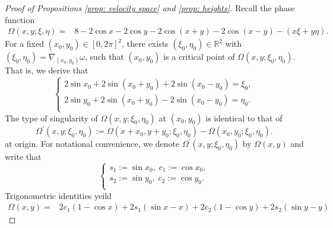 \documentclass[12pt]{amsart}
\newcommand{\R}{\mathbb{R}}
\begin{document}
	\begin{proof}[Proof of Propositions \ref{prop: velocity space} and \ref{prop: heights}]
		
		Recall the phase function \begin{equation}
			\begin{aligned}
				\Omega\left(x,y;\xi,\eta\right)=&8-2\cos x-2\cos y-2\cos\left(x+y\right)-2\cos\left(x-y\right)-\left(x\xi+y\eta\right).
			\end{aligned}  
		\end{equation}
For a fixed $\left(x_{0},y_{0}\right)\in\left[0,2\pi\right]^{2}$, there exists  $\left(\xi_{0},\eta_{0}\right)\in\R^{2}$ with $\left(\xi_{0},\eta_{0}\right)=\nabla_{\left(x_{0},y_{0}\right)}\omega$,  such that $\left(x_{0},y_{0}\right)$ is a critical point of $\Omega\left(x,y;\xi_{0},\eta_{0}\right)$. That is, we derive that \begin{equation*}
			\begin{cases}
				2\sin x_{0}+2\sin\left(x_{0}+y_{0}\right)+2\sin\left(x_{0}-y_{0}\right)=\xi_{0},\\
				2\sin y_{0}+2\sin\left(x_{0}+y_{0}\right)-2\sin\left(x_{0}-y_{0}\right)=\eta_{0}.\\
			\end{cases}
		\end{equation*}
		 The type of singularity of $\Omega\left(x,y;\xi_{0},\eta_{0}\right)$ at $\left(x_{0},y_{0}\right)$ is identical to that of 
		\begin{equation}
			\Omega^{\prime}\left(x,y;\xi_{0},\eta_{0}\right) := \Omega\left(x+x_{0},y+y_{0};\xi_{0},\eta_{0}\right)-\Omega\left(x_{0},y_{0};\xi_{0},\eta_{0}\right).
		\end{equation}
at origin. For notational convenience, we denote $\Omega^{\prime}\left(x,y;\xi_{0},\eta_{0}\right)$ by $\Omega(x,y)$ and write that
		\begin{equation}\label{sici}
			\begin{cases}
				s_{1}:=\sin x_{0},\;c_{1}:=\cos x_{0},\\
				s_{2}:=\sin y_{0},\;c_{2}:=\cos y_{0}.\\
			\end{cases}
		\end{equation}
		Trigonometric identities yeild
		\begin{equation*}
			\begin{aligned}
				\Omega\left(x,y\right)
				=&2c_{1}\left(1-\cos x\right)+2s_{1}\left(\sin x-x\right)+2c_{2}\left(1-\cos y\right)+2s_{2}\left(\sin y-y\right)

\end{aligned}
\end{equation*}
\end{proof}
\end{document}
